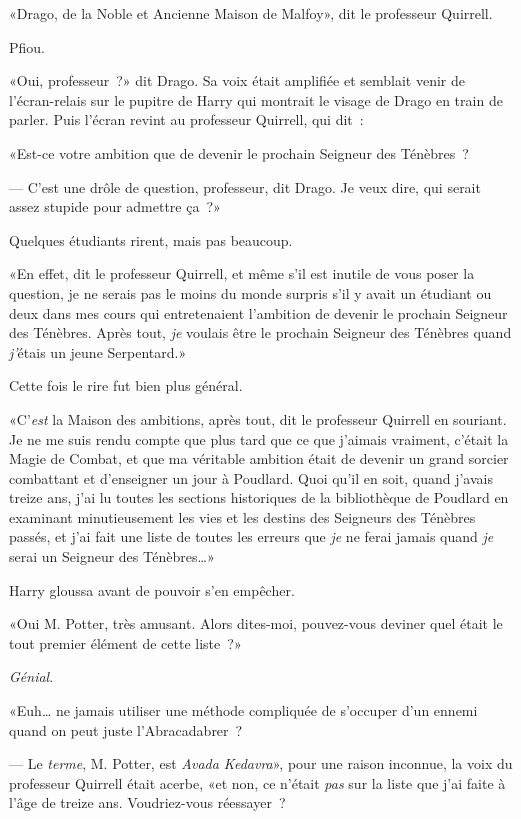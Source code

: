 «Drago, de la Noble et Ancienne Maison de Malfoy», dit le professeur Quirrell.

Pfiou.

«Oui, professeur~?» dit Drago. Sa voix était amplifiée et semblait venir de l'écran-relais sur le pupitre de Harry qui montrait le visage de Drago en train de parler. Puis l'écran revint au professeur Quirrell, qui dit~:

«Est-ce votre ambition que de devenir le prochain Seigneur des Ténèbres~?

--- C'est une drôle de question, professeur, dit Drago. Je veux dire, qui serait assez stupide pour admettre ça~?»

Quelques étudiants rirent, mais pas beaucoup.

«En effet, dit le professeur Quirrell, et même s'il est inutile de vous poser la question, je ne serais pas le moins du monde surpris s'il y avait un étudiant ou deux dans mes cours qui entretenaient l'ambition de devenir le prochain Seigneur des Ténèbres. Après tout, \emph{je} voulais être le prochain Seigneur des Ténèbres quand \emph{j'}étais un jeune Serpentard.»

Cette fois le rire fut bien plus général.

«C'\emph{est} la Maison des ambitions, après tout, dit le professeur Quirrell en souriant. Je ne me suis rendu compte que plus tard que ce que j'aimais vraiment, c'était la Magie de Combat, et que ma véritable ambition était de devenir un grand sorcier combattant et d'enseigner un jour à Poudlard. Quoi qu'il en soit, quand j'avais treize ans, j'ai lu toutes les sections historiques de la bibliothèque de Poudlard en examinant minutieusement les vies et les destins des Seigneurs des Ténèbres passés, et j'ai fait une liste de toutes les erreurs que \emph{je} ne ferai jamais quand \emph{je} serai un Seigneur des Ténèbres…»

Harry gloussa avant de pouvoir s'en empêcher.

«Oui M. Potter, très amusant. Alors dites-moi, pouvez-vous deviner quel était le tout premier élément de cette liste~?»

\emph{Génial}.

«Euh… ne jamais utiliser une méthode compliquée de s'occuper d'un ennemi quand on peut juste l'Abracadabrer~?

--- Le \emph{terme}, M. Potter, est \emph{Avada Kedavra}», pour une raison inconnue, la voix du professeur Quirrell était acerbe, «et non, ce n'était \emph{pas} sur la liste que j'ai faite à l'âge de treize ans. Voudriez-vous réessayer~?

